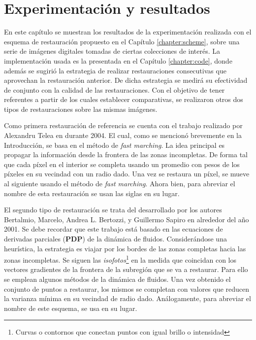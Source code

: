 \chapter{Experimentaci\'on y resultados}\label{chapter:results}
En este cap\'itulo se muestran los resultados de la experimentaci\'on realizada con el esquema de restauraci\'on propuesto en el Cap\'itulo \ref{chapter:scheme}, sobre una serie de im\'agenes digitales tomadas de ciertas colecciones de inter\'es. La implementaci\'on usada es la presentada en el Cap\'itulo \ref{chapter:code}, donde adem\'as se sugiri\'o la estrategia de realizar restauraciones consecutivas que aprovechan la restauraci\'on anterior. De dicha estrategia se medir\'a su efectividad de conjunto con la calidad de las restauraciones. Con el objetivo de tener referentes a partir de los cuales establecer comparativas, se realizaron otros dos tipos de restauraciones sobre las mismas im\'agenes.

Como primera restauraci\'on de referencia se cuenta con el trabajo realizado por Alexandru Telea en \cite{telea2004image} durante 2004. El cual, como se mencion\'o brevemente en la Introducci\'on, se basa en el m\'etodo de \textit{fast marching}. La idea principal es propagar la informaci\'on desde la frontera de las zonas incompletas. De forma tal que cada p\'ixel en el interior se completa usando un promedio con pesos de los p\'ixeles en su vecindad con un radio dado. Una vez se restaura un p\'ixel, se mueve al siguiente usando el m\'etodo de \textit{fast marching}. Ahora bien, para abreviar el nombre de esta restauraci\'on se usan las siglas \TELEA en su lugar.

El segundo tipo de restauraci\'on se trata del desarrollado por los autores Bertalmio, Marcelo, Andrea L. Bertozzi, y Guillermo Sapiro en \cite{bertalmio2001navier} alrededor del año 2001. Se debe recordar que este trabajo est\'a basado en las ecuaciones de derivadas parciales (\textbf{PDP}) de la din\'amica de fluidos. Considerándose una heur\'istica, la estrategia es viajar por los bordes de las zonas completas hacia las zonas incompletas. Se siguen las \textit{isofotos}\footnote{Curvas o contornos que conectan puntos con igual brillo o intensidad} en la medida que coincidan con los vectores gradientes de la frontera de la subregi\'on que se va a restaurar. Para ello se emplean algunos m\'etodos de la din\'amica de fluidos. Una vez obtenido el conjunto de puntos a restaurar, los mismos se completan con valores que reducen la varianza m\'inima en su vecindad de radio dado. An\'alogamente, para abreviar el nombre de este esquema, se usa \NS en su lugar.

